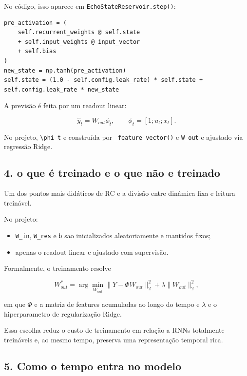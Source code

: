 \documentclass[12pt]{article}
\providecommand{\tightlist}{%
          \setlength{\itemsep}{0pt}\setlength{\parskip}{0pt}}
\begin{document}
No código, isso aparece em \texttt{EchoStateReservoir.step()}:

\begin{verbatim}
pre_activation = (
    self.recurrent_weights @ self.state
    + self.input_weights @ input_vector
    + self.bias
)
new_state = np.tanh(pre_activation)
self.state = (1.0 - self.config.leak_rate) * self.state + self.config.leak_rate * new_state
\end{verbatim}

A previsão é feita por um readout linear:

\[
\hat{y}_t = W_{out} \phi_t,
\qquad
\phi_t = [1; u_t; x_t].
\]

No projeto, \texttt{\textbackslash{}phi\_t} e construída por \texttt{\_feature\_vector()} e \texttt{W\_out} e ajustado via regressão Ridge.

\subsection{4. o que é treinado e o que não e treinado}\label{4-o-que-uxe9-treinado-e-o-que-nuxe3o-e-treinado}

Um dos pontos mais didáticos de RC e a divisão entre dinâmica fixa e leitura treinável.

No projeto:

\begin{itemize}
\tightlist
\item
  \texttt{W\_in}, \texttt{W\_res} e \texttt{b} sao inicializados aleatoriamente e mantidos fixos;
\item
  apenas o readout linear e ajustado com supervisão.
\end{itemize}

Formalmente, o treinamento resolve

\[
W_{out}^* = \arg\min_{W_{out}}
\|Y - \Phi W_{out}\|_2^2 + \lambda \|W_{out}\|_2^2,
\]

em que \(\Phi\) e a matriz de features acumuladas ao longo do tempo e \(\lambda\) e o hiperparametro de regularização Ridge.

Essa escolha reduz o custo de treinamento em relação a RNNs totalmente treináveis e, ao mesmo tempo, preserva uma representação temporal rica.

\subsection{5. Como o tempo entra no modelo}\label{5-como-o-tempo-entra-no-modelo}
\end{document}
